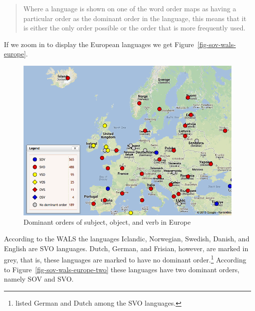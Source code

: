 \begin{quote}
Where a language is shown on one of the word order maps as having a particular order as the dominant
order in the language, this means that it is either the only order possible or the order
that is more frequently used. \citep{Dryer2013a}
\end{quote}
%
%
%
If we zoom in to display the European languages we get Figure~\vref{fig-sov-wals-europe}.
\begin{figure}[htbp]
\includegraphics[width=.898\textwidth]{Pictures/WALS-SOV-Europa}
\caption{\label{fig-sov-wals-europe}Dominant orders of subject, object, and verb in Europe}
\end{figure}
According to the WALS the languages Iclandic, Norwegian, Swedish, Danish, and English are SVO
languages. Dutch, German, and Frisian, however, are marked in grey, that is, these languages are
marked to have no dominant order.\footnote{
  \citet[]{Greenberg63a-u} listed German and Dutch among the SVO languages.%
} According to Figure~\vref{fig-sov-wals-europe-two} these languages
have two dominant orders, namely SOV and SVO.
